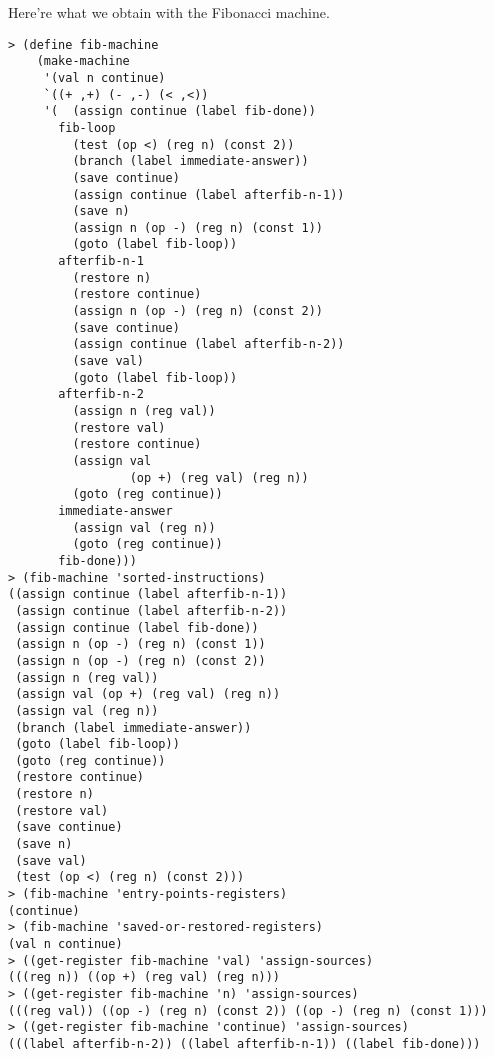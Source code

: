 \documentclass[a4paper,12pt]{article}
\begin{document}
Here're what we obtain with the Fibonacci machine.
\begin{lstlisting}
> (define fib-machine
    (make-machine
     '(val n continue)
     `((+ ,+) (- ,-) (< ,<))
     '(  (assign continue (label fib-done))
       fib-loop
         (test (op <) (reg n) (const 2))
         (branch (label immediate-answer))
         (save continue)
         (assign continue (label afterfib-n-1))
         (save n)
         (assign n (op -) (reg n) (const 1))
         (goto (label fib-loop))
       afterfib-n-1
         (restore n)
         (restore continue)
         (assign n (op -) (reg n) (const 2))
         (save continue)
         (assign continue (label afterfib-n-2))
         (save val)
         (goto (label fib-loop))
       afterfib-n-2
         (assign n (reg val))
         (restore val)
         (restore continue)
         (assign val
                 (op +) (reg val) (reg n))
         (goto (reg continue))
       immediate-answer
         (assign val (reg n))
         (goto (reg continue))
       fib-done)))
> (fib-machine 'sorted-instructions)
((assign continue (label afterfib-n-1))
 (assign continue (label afterfib-n-2))
 (assign continue (label fib-done))
 (assign n (op -) (reg n) (const 1))
 (assign n (op -) (reg n) (const 2))
 (assign n (reg val))
 (assign val (op +) (reg val) (reg n))
 (assign val (reg n))
 (branch (label immediate-answer))
 (goto (label fib-loop))
 (goto (reg continue))
 (restore continue)
 (restore n)
 (restore val)
 (save continue)
 (save n)
 (save val)
 (test (op <) (reg n) (const 2)))
> (fib-machine 'entry-points-registers)
(continue)
> (fib-machine 'saved-or-restored-registers)
(val n continue)
> ((get-register fib-machine 'val) 'assign-sources)
(((reg n)) ((op +) (reg val) (reg n)))
> ((get-register fib-machine 'n) 'assign-sources)
(((reg val)) ((op -) (reg n) (const 2)) ((op -) (reg n) (const 1)))
> ((get-register fib-machine 'continue) 'assign-sources)
(((label afterfib-n-2)) ((label afterfib-n-1)) ((label fib-done)))
\end{lstlisting}
\end{document}
